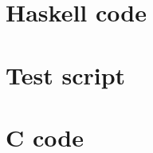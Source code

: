 \documentclass[5pt]{article}
\begin{document}
\maketitle

\section{Haskell code}


\section{Test script}


\section{C code}

\newpage

\newpage

\end{document}

